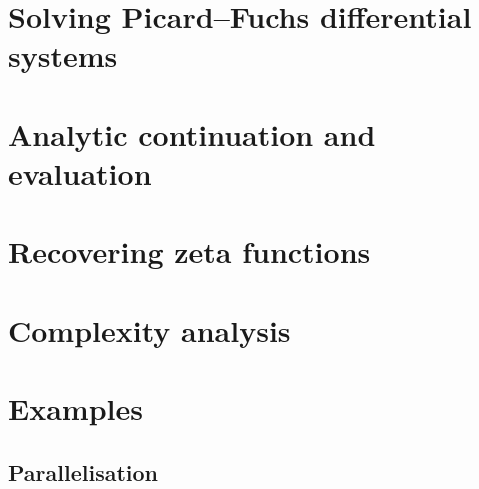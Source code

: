 \documentclass[a4paper,11pt]{article}
\numberwithin{equation}{section}
\theoremstyle{definition}
\begin{document}
\section{Solving Picard--Fuchs differential systems}

\section{Analytic continuation and evaluation}

\section{Recovering zeta functions}

\section{Complexity analysis}

\section{Examples}

\subsection{Parallelisation}
\end{document}
